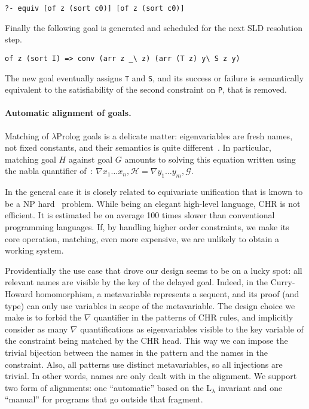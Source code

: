 \documentclass{easychair}
\begin{document}
\begin{Verbatim}
?- equiv [of z (sort c0)] [of z (sort c0)]
\end{Verbatim}

Finally the following  goal is generated and scheduled for the next
SLD resolution step.

\begin{Verbatim}
of z (sort I) => conv (arr z _\ z) (arr (T z) y\ S z y)
\end{Verbatim}

The new goal eventually assigns \verb+T+ and \verb+S+, and its success
or failure is semantically equivalent to the satisfiability of the
second constraint on \verb+P+, that is removed.

\paragraph{Automatic alignment of goals.}
\label{sec:realchr}

Matching of $\lambda$Prolog goals is a delicate matter: eigenvariables
are fresh names, not fixed constants, and their semantics is quite
different~\cite{nabla}.  
In particular, matching goal $H$ against goal $G$ amounts
to solving this equation written using the nabla quantifier of~\cite{nabla}:
$
 \nabla x_1\ldots x_n, \mathcal{H} = \nabla y_1\ldots y_m, \mathcal{G}
$.

In the general case it is closely related to equivariate unification
that is known to be a NP hard~\cite{Cheney2004} problem.  While being
an elegant high-level language, CHR is not efficient.  It is estimated
be on average 100 times slower than conventional programming
languages.  If, by handling higher order constraints, we make its core
operation, matching, even more expensive, we are unlikely to obtain a
working system.

Providentially the use case that drove our design seems to be on a lucky
spot: all relevant names are visible by the key of the delayed goal.
Indeed, in the Curry-Howard homomorphism, a metavariable represents a
sequent, and its proof (and type) can only use variables in scope of
the metavariable.  The design choice we make is to forbid the
$\nabla$ quantifier in the patterns of CHR rules, and implicitly consider as many
$\nabla$ quantifications as eigenvariables visible to the key variable
of the constraint being matched by the CHR head.  This way we can impose
the trivial bijection between the names in the pattern and the names
in the constraint.  Also, all patterns use distinct metavariables, so
all injections are trivial.  In other words, names are only dealt with
in the alignment.
We support two form of alignments: one ``automatic'' based on the
L$_\lambda$ invariant and one ``manual'' for programs that go
outside that fragment.
\end{document}
